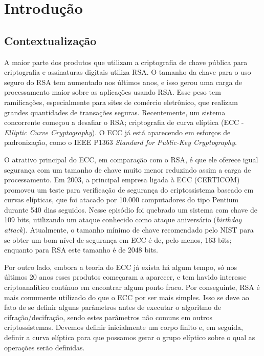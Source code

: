 \chapter*[Introdução]{Introdução}

\section*{Contextualização}
A maior parte dos produtos que utilizam a criptografia de chave pública para criptografia e assinaturas digitais utiliza RSA. O tamanho da chave para o uso seguro do RSA tem aumentado nos últimos anos, e isso gerou uma carga de processamento maior sobre as aplicações usando RSA. Esse peso tem ramificações, especialmente para sites de comércio eletrônico, que realizam grandes quantidades de transações seguras. Recentemente, um sistema concorrente começou a desafiar o RSA; criptografia de curva elíptica (ECC - \textit{Elliptic Curve Cryptography}). O ECC já está aparecendo em esforços de padronização, como o IEEE P1363 \textit{Standard for Public-Key Cryptography}. \cite{Lee:2011}

O atrativo principal do ECC, em comparação com o RSA, é que ele oferece igual segurança com um tamanho de chave muito menor reduzindo assim a carga de processamento. \cite{Stallings:2011} Em 2003, a principal empresa ligada à ECC (CERTICOM) promoveu um teste para verificação de segurança do criptossistema baseado em curvas elípticas, que foi atacado por 10.000 computadores do tipo Pentium durante 540 dias seguidos. Nesse episódio foi quebrado um sistema com chave de 109 bits, utilizando um ataque conhecido como ataque aniversário (\textit{birthday attack}). Atualmente, o tamanho mínimo de chave recomendado pelo NIST para se obter um bom nível de segurança em ECC é de, pelo menos, 163 bits; enquanto para RSA este tamanho é de 2048 bits. \cite{Sangalli:2011}

Por outro lado, embora a teoria do ECC já exista há algum tempo, só nos últimos 20 anos esses produtos começaram a aparecer, e tem havido interesse criptoanalítico contínuo em encontrar algum ponto fraco. \cite{Stallings:2011} Por conseguinte, RSA é mais comumente utilizado do que o ECC por ser mais simples. Isso se deve ao fato de se definir alguns parâmetros antes de executar o algoritmo de cifração/decifração, sendo estes parâmetros não comuns em outros criptossistemas. Devemos definir inicialmente um corpo finito e, em seguida, definir a curva elíptica para que possamos gerar o grupo elíptico sobre o qual as operações serão definidas. \cite{Sangalli:2011}

